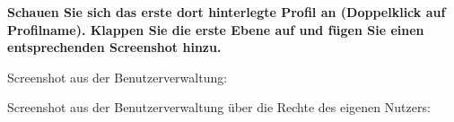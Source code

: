 \textbf{Schauen Sie sich das erste dort hinterlegte Profil an (Doppelklick auf
Profilname). Klappen Sie die erste Ebene auf und fügen Sie einen entsprechenden
Screenshot hinzu.
}

Screenshot aus der Benutzerverwaltung:
\begin{center}
\end{center}
\clearpage

Screenshot aus der Benutzerverwaltung über die Rechte des eigenen Nutzers:
\begin{center}
\end{center}
